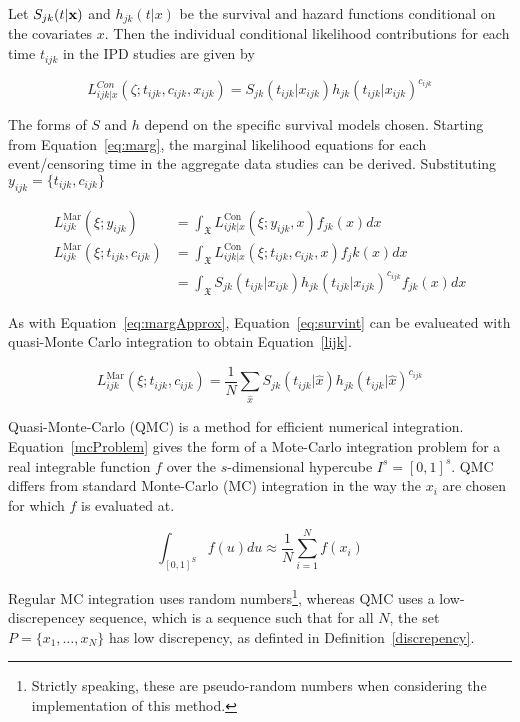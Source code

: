 Let $S_{jk}(t|\bf{x})$ and $h_{jk}(t|x)$ be the survival and hazard functions conditional on the covariates $x$. Then the individual conditional likelihood contributions for each time $t_{ijk}$ in the IPD studies are given by

\begin{equation}
    L_{ijk|x}^{Con}(\zeta;t_{ijk},c_{ijk},x_{ijk}) = S_{jk}(t_{ijk}| x_{ijk})h_{jk}(t_{ijk}|x_{ijk})^{c_{ijk}}
\end{equation}

The forms of $S$ and $h$ depend on the specific survival models chosen. Starting from Equation~\ref{eq:marg}, the marginal likelihood equations for each event/censoring time in the aggregate data studies can be derived. Substituting $y_{ijk} = \{t_{ijk}, c_{ijk}\}$

\begin{align}
    L_{ijk}^{\text{Mar}}(\xi; y_{ijk}) &= \int_{\mathfrak{X}} L_{ijk|x}^{\text{Con}}(\xi; y_{ijk}, x)f_{jk}(x)dx \\ 
    L_{ijk}^{\text{Mar}}(\xi; t_{ijk}, c_{ijk}) &= \int_{\mathfrak{X}} L_{ijk|x}^{\text{Con}}(\xi; t_{ijk}, c_{ijk}, x)f_jk(x)dx \\
                                       &= \int_{\mathfrak{X}} S_{jk}(t_{ijk}| x_{ijk})h_{jk}(t_{ijk}|x_{ijk})^{c_{ijk}} f_{jk}(x)dx\label{eq:survint}
\end{align}

As with Equation~\ref{eq:margApprox}, Equation~\ref{eq:survint} can be evalueated with quasi-Monte Carlo integration to obtain Equation~\ref{lijk}. 

\begin{equation}
    L_{ijk}^{\text{Mar}}(\xi; t_{ijk}, c_{ijk}) = \frac{1}{N}\sum_{\hat{x}}S_{jk}(t_{ijk}|\hat{x})h_{jk}(t_{ijk}|\hat{x})^{c_{ijk}}
    \label{lijk}
\end{equation}

Quasi-Monte-Carlo (QMC) is a method for efficient numerical integration. Equation~\ref{mcProblem} gives the form of a Mote-Carlo integration problem for a real integrable function $f$ over the $s$-dimensional hypercube $I^s = [0,1]^s$. QMC differs from standard Monte-Carlo (MC) integration in the way the $x_i$ are chosen for which $f$ is evaluated at. 

\begin{equation}
    \int_{[0,1]^S}f(u)du \approx \frac{1}{N}\sum_{i = 1}^{N}f(x_i)
    \label{mcProblem}
\end{equation}

Regular MC integration uses random numbers\footnote{Strictly speaking, these are pseudo-random numbers when considering the implementation of this method.}, whereas QMC uses a low-discrepencey sequence, which is a sequence such that for all $N$, the set $P = \{x_1, \ldots, x_N\}$ has low discrepency, as definted in Definition~\ref{discrepency}.

